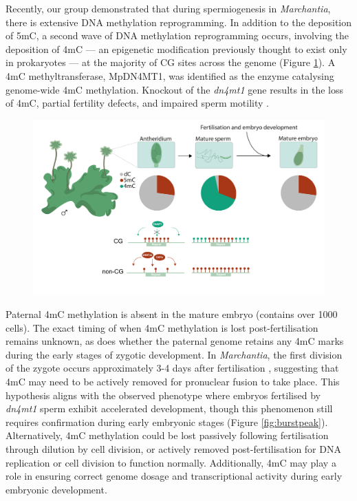 Recently, our group demonstrated that during spermiogenesis in \textit{Marchantia}, there is extensive DNA methylation reprogramming. In addition to the deposition of 5mC, a second wave of DNA methylation reprogramming occurs, involving the deposition of 4mC — an epigenetic modification previously thought to exist only in prokaryotes — at the majority of CG sites across the genome (Figure \ref{fig:Mp_graphical_abstract}). A 4mC methyltransferase, MpDN4MT1, was identified as the enzyme catalysing genome-wide 4mC methylation. Knockout of the \textit{dn4mt1} gene results in the loss of 4mC, partial fertility defects, and impaired sperm motility \citep{RN189}.

\begin{figure}[htbp!] 
\centering    
    \includegraphics[width=1\textwidth]{Chapter3/Figs/Intro/Graphical_abstract.pdf}
\caption{}
\label{fig:Mp_graphical_abstract}
\captionsetup{font=small}
    \caption*{}
\end{figure}

Paternal 4mC methylation is absent in the mature embryo (contains over 1000 cells). The exact timing of when 4mC methylation is lost post-fertilisation remains unknown, as does whether the paternal genome retains any 4mC marks during the early stages of zygotic development. In \textit{Marchantia}, the first division of the zygote occurs approximately 3-4 days after fertilisation \citep{RN139}, suggesting that 4mC may need to be actively removed for pronuclear fusion to take place. This hypothesis aligns with the observed phenotype where embryos fertilised by \textit{dn4mt1} sperm exhibit accelerated development, though this phenomenon still requires confirmation during early embryonic stages (Figure \ref{fig:burstpeak}). Alternatively, 4mC methylation could be lost passively following fertilisation through dilution by cell division, or actively removed post-fertilisation for DNA replication or cell division to function normally. Additionally, 4mC may play a role in ensuring correct genome dosage and transcriptional activity during early embryonic development.

